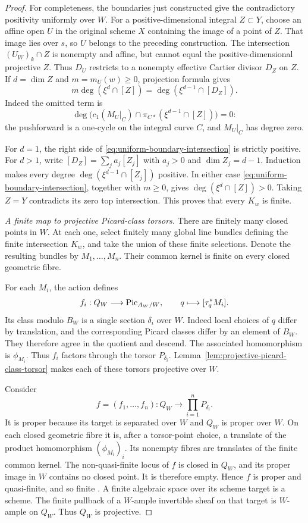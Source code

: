 \begin{proof}
For completeness, the boundaries just constructed give the
contradictory positivity uniformly over $W$.
For a positive-dimensional integral $Z\subset Y$, choose
an affine open $U$ in the original scheme $X$ containing the
image of a point of $Z$. That image lies over $s$, so $U$
belongs to the preceding construction. The intersection
$(U_W)_k\cap Z$ is nonempty and affine, but cannot equal the
positive-dimensional projective $Z$.
Thus $D_U$ restricts to a nonempty effective Cartier divisor
$D_Z$ on $Z$. If $d=\dim Z$ and $m=m_U(w)\geq0$, projection
formula gives
\begin{equation}\label{eq:uniform-boundary-intersection}
 m\deg(\xi^d\cap[Z])=
 \deg(\xi^{d-1}\cap[D_Z]).
\end{equation}
Indeed the omitted term is
\[
 \deg\bigl(c_1(M_U|_C)\cap
       \pi_{C*}(\xi^{d-1}\cap[Z])\bigr)=0:
\]
the pushforward is a one-cycle on the integral curve $C$,
and $M_U|_C$ has degree zero.

For $d=1$, the right side of
\eqref{eq:uniform-boundary-intersection} is strictly positive.
For $d>1$, write
$[D_Z]=\sum_j a_j[Z_j]$ with $a_j>0$ and $\dim Z_j=d-1$.
Induction makes every degree
$\deg(\xi^{d-1}\cap[Z_j])$ positive. In either case
\eqref{eq:uniform-boundary-intersection}, together with $m\geq0$,
gives $\deg(\xi^d\cap[Z])>0$.
Taking $Z=Y$ contradicts its zero top intersection.
This proves that every $K_w$ is finite.

\emph{A finite map to projective Picard-class torsors.}
There are finitely many closed points in $W$. At each one,
select finitely many global line bundles defining the
finite intersection $K_w$, and take the union of these finite
selections. Denote the resulting bundles by $M_1,\ldots,M_n$.
Their common kernel is finite on every closed geometric fibre.

For each $M_i$, the action defines
\[
 f_i:Q_W\longrightarrow\operatorname{Pic}_{A_W/W},
 \qquad q\longmapsto[\tau_q^*M_i].
\]
Its class modulo $B_W$ is a single section $\delta_i$ over $W$.
Indeed local choices of $q$ differ by translation, and the
corresponding Picard classes differ by an element of $B_W$.
They therefore agree in the quotient and descend.
The associated homomorphism is $\phi_{M_i}$.
Thus $f_i$ factors through the torsor $P_{\delta_i}$.
Lemma~\ref{lem:projective-picard-class-torsor} makes each of
these torsors projective over $W$.

Consider
\[
 f=(f_1,\ldots,f_n):Q_W\longrightarrow
       \prod_{i=1}^n P_{\delta_i}.
\]
It is proper because its target is separated over $W$ and
$Q_W$ is proper over $W$. On each closed geometric fibre it is,
after a torsor-point choice, a translate of the product
homomorphism $(\phi_{M_i})_i$. Its nonempty fibres are
translates of the finite common kernel.
The non-quasi-finite locus of $f$ is closed in $Q_W$, and its
proper image in $W$ contains no closed point. It is therefore
empty. Hence $f$ is proper and quasi-finite, and so finite
\cite[Tag~0A4X]{Stacks}.
A finite algebraic space over its scheme target is a scheme.
The finite pullback of a $W$-ample invertible sheaf on that
target is $W$-ample on $Q_W$. Thus $Q_W$ is projective.


\end{proof}
